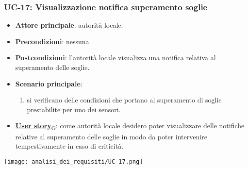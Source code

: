 \subsubsection{UC-17: Visualizzazione notifica superamento soglie}
\begin{itemize}
	\item \textbf{Attore principale}: autorità locale.
	\item \textbf{Precondizioni}: nessuna
	\item \textbf{Postcondizioni}: l'autorità locale visualizza una notifica relativa al superamento delle soglie.
	\item \textbf{Scenario principale}:
	      \begin{enumerate}
		      \item si verificano delle condizioni che portano al superamento di soglie prestabilite per uno dei sensori.
	      \end{enumerate}
	\item \href{https://7last.github.io/docs/pb/documentazione-interna/glossario\#user-story}{\textbf{User story}\textsubscript{G}}:
	      come autorità locale desidero poter visualizzare delle notifiche relative al superamento delle soglie in modo da poter intervenire tempestivamente in caso di criticità.
\end{itemize}
\begin{center}
	\texttt{[image: analisi\_dei\_requisiti/UC-17.png]}
\end{center}

